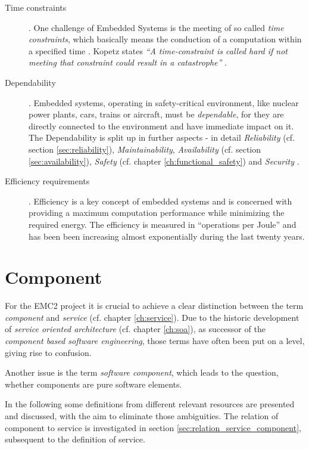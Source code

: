 \begin{description}
	\item [Time constraints].
	One challenge of Embedded Systems is the meeting of so called \emph{time constraints}, which basically means the conduction of a computation within a specified time \cite[p.8-9]{marwedel} \cite{rodrigues2011}. Kopetz states \emph{``A time-constraint is called hard if not meeting that constraint could result in a catastrophe''} \cite{kopetz}.
	\item [Dependability].
	Embedded systems, operating in safety-critical environment, like nuclear power plants, cars, trains or aircraft, must be \emph{dependable}, for they are directly connected to the environment and have immediate impact on it. The Dependability is split up in further aspects - in detail \emph{Reliability} (cf. section \ref{sec:reliability}), \emph{Maintainability}, \emph{Availability} (cf. section \ref{sec:availability}), \emph{Safety} (cf. chapter \ref{ch:functional_safety}) and \emph{Security} \cite[p.4-5]{marwedel}.
	\item [Efficiency requirements].
	Efficiency is a key concept of embedded systems and is concerned with providing a maximum computation performance while minimizing the required energy. The efficiency is measured in ``operations per Joule'' and has been been increasing almost exponentially during the last twenty years.
\end{description}






\section{Component}

\label{ch:component}

For the EMC2 project it is crucial to achieve a clear distinction between the term \emph{component} and \emph{service} (cf. chapter \ref{ch:service}). Due to the historic development of \emph{service oriented architecture} (cf. chapter \ref{ch:soa}), as successor of the \emph{component based software engineering}, those terms have often been put on a level, giving rise to confusion. 

Another issue is the term \emph{software component}, which leads to the question, whether components are pure software elements.

In the following some definitions from different relevant resources are presented and discussed, with the aim to eliminate those ambiguities. The relation of component to service is investigated in section \ref{sec:relation_service_component}, subsequent to the definition of service.

